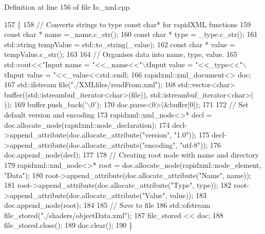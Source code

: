 Definition at line 156 of file Io\-\_\-xml.\-cpp.


\begin{DoxyCode}
157 \{
158   \textcolor{comment}{// Converts strings to type const char* for rapidXML functions}
159   \textcolor{keyword}{const} \textcolor{keywordtype}{char} * name =\_name.c\_str();
160   \textcolor{keyword}{const} \textcolor{keywordtype}{char} * type = \_type.c\_str();
161   std::string tempValue = std::to\_string(\_value);
162   \textcolor{keyword}{const} \textcolor{keywordtype}{char} * value = tempValue.c\_str();
163 
164   \textcolor{comment}{// Organises data into name, type, value.}
165   std::cout<<\textcolor{stringliteral}{"Input name = "}<<\_name<<\textcolor{stringliteral}{"\(\backslash\)tInput value = "}<<\_type<<\textcolor{stringliteral}{"\(\backslash\)tInput value = "}<<\_value<<std::endl;
166   rapidxml::xml\_document<> doc;
167   std::ifstream file(\textcolor{stringliteral}{"./XMLfiles/readFrom.xml"});
168   std::vector<char> buffer((std::istreambuf\_iterator<char>(file)), std::istreambuf\_iterator<char>( ));
169   buffer.push\_back(\textcolor{charliteral}{'\(\backslash\)0'});
170   doc.parse<0>(&buffer[0]);
171 
172   \textcolor{comment}{// Set default version and encoding}
173   rapidxml::xml\_node<>* decl = doc.allocate\_node(rapidxml::node\_declaration);
174   decl->append\_attribute(doc.allocate\_attribute(\textcolor{stringliteral}{"version"}, \textcolor{stringliteral}{"1.0"}));
175   decl->append\_attribute(doc.allocate\_attribute(\textcolor{stringliteral}{"encoding"}, \textcolor{stringliteral}{"utf-8"}));
176   doc.append\_node(decl);
177 
178   \textcolor{comment}{// Creating root node with name and directory}
179   rapidxml::xml\_node<>* root = doc.allocate\_node(rapidxml::node\_element, \textcolor{stringliteral}{"Data"});
180   root->append\_attribute(doc.allocate\_attribute(\textcolor{stringliteral}{"Name"}, name));
181   root->append\_attribute(doc.allocate\_attribute(\textcolor{stringliteral}{"Type"}, type));
182   root->append\_attribute(doc.allocate\_attribute(\textcolor{stringliteral}{"Value"}, value));
183   doc.append\_node(root);
184 
185   \textcolor{comment}{// Save to file}
186   std::ofstream file\_stored(\textcolor{stringliteral}{"./shaders/objectData.xml"});
187   file\_stored << doc;
188   file\_stored.close();
189   doc.clear();
190 \}
\end{DoxyCode}
